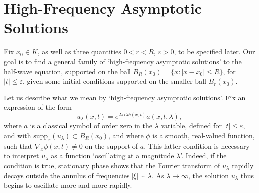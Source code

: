 \documentclass{article}
\theoremstyle{plain}
\theoremstyle{remark}
\theoremstyle{definition}
\DeclareMathOperator{\RR}{\mathbb{R}}
\begin{document}


\section{High-Frequency Asymptotic Solutions}

Fix $x_0 \in K$, as well as three quantities $0 < r < R$, $\varepsilon > 0$, to be specified later. Our goal is to find a general family of `high-frequency asymptotic solutions' to the half-wave equation, supported on the ball $B_R(x_0) = \{ x: |x - x_0| \leq R \}$, for $|t| \leq \varepsilon$, given some initial conditions supported on the smaller ball $B_r(x_0)$.


Let us describe what we mean by `high-frequency asymptotic solutions'. Fix an expression of the form
%
\[ u_\lambda(x,t) = e^{2 \pi i \lambda \phi(x,t)} a(x,t,\lambda), \]
%
where $a$ is a classical symbol of order zero in the $\lambda$ variable, defined for $|t| \leq \varepsilon$, and with $\text{supp}_x(u_\lambda) \subset B_R(x_0)$, and where $\phi$ is a smooth, real-valued function, such that $\nabla_x \phi(x,t) \neq 0$ on the support of $a$. This latter condition is necessary to interpret $u_\lambda$ as a function `oscillating at a magnitude $\lambda$'. Indeed, if the condition is true, stationary phase shows that the Fourier transform of $u_\lambda$ rapidly decays outside the annulus of frequencies $|\xi| \sim \lambda$. As $\lambda \to \infty$, the solution $u_\lambda$ thus begins to oscillate more and more rapidly.

%
\end{document}
